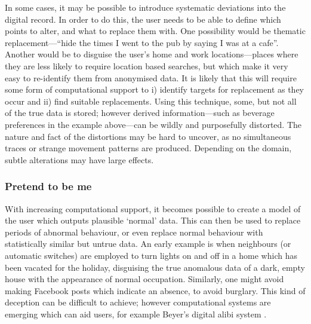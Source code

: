 \documentclass{IOS-Book-Article}     %
\newcommand{\tbox}[3][red]{{
\color{#1}\noindent{
   \fbox{\scriptsize{ {\bf #2} \textsl{#3}}}
   \vspace{2pt}
}
}}
\newcommand{\todo}[1]{\tbox{TODO:}{#1}}
\begin{document}
In some cases, it may be possible to introduce systematic deviations into the
digital record. In order to do this, the user needs to be able to define which
points to alter, and what to replace them with. One possibility would be
thematic replacement---``hide the times I went to the pub by saying I was at a
cafe''. Another would be to disguise the user's home and work locations---places
where they are less likely to require location based searches, but which make it
very easy to re-identify them from anonymised data.
It is likely that this will require some form of computational support to i)
identify targets for replacement as they occur and ii) find suitable
replacements.
Using this technique, some, but not all of the true data is stored; however
derived information---such as beverage preferences in the  example above---can
be wildly and purposefully distorted. The nature and fact of
the distortions may be hard to uncover, as no simultaneous traces or strange
movement patterns are produced. Depending on the domain, subtle alterations may
have large effects.

\subsubsection{Pretend to be me}

With increasing computational support, it becomes possible to create a model of
the user which outputs plausible `normal' data. This can then be used to
replace periods of abnormal behaviour, or even replace normal behaviour with
statistically similar but untrue data. An early example is when neighbours (or
automatic switches) are employed to turn lights on and off in a home which has
been vacated for the holiday, disguising the true anomalous data of a dark,
empty house with the appearance of normal occupation. Similarly, one might avoid
making Facebook posts which indicate an absence, to avoid burglary. This kind of
deception can be difficult to achieve; however computational systems are
emerging which can aid users, for example Beyer's digital alibi system
\cite{beyer2014Alibi}.
\end{document}
